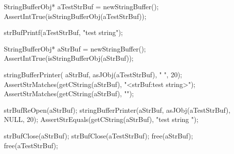 
\startCTest
  StringBufferObj* aTestStrBuf = newStringBuffer();
  AssertIntTrue(isStringBufferObj(aTestStrBuf));
  
  strBufPrintf(aTestStrBuf, "test string");
  
  StringBufferObj* aStrBuf = newStringBuffer();
  AssertIntTrue(isStringBufferObj(aStrBuf));
  
  stringBufferPrinter(
    aStrBuf, asJObj(aTestStrBuf), "  ", 20);
  AssertStrMatches(getCString(aStrBuf), "<strBuf:test string>");
  AssertStrMatches(getCString(aStrBuf), "\n");
  
  strBufReOpen(aStrBuf);
  stringBufferPrinter(aStrBuf, asJObj(aTestStrBuf), NULL, 20);
  AssertStrEquals(getCString(aStrBuf), "test string ");
  
  strBufClose(aStrBuf);
  strBufClose(aTestStrBuf);
  free(aStrBuf);
  free(aTestStrBuf);
\stopCTest
\stopTestCase
\stopTestSuite

